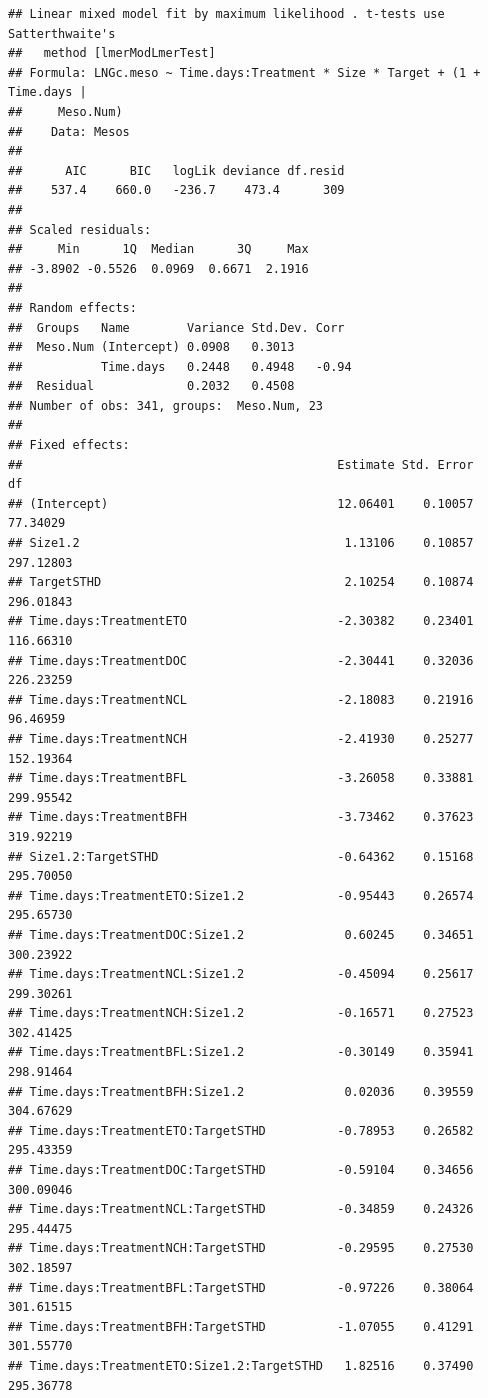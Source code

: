 \documentclass[
]{article}
\begin{document}
\begin{verbatim}
## Linear mixed model fit by maximum likelihood . t-tests use Satterthwaite's
##   method [lmerModLmerTest]
## Formula: LNGc.meso ~ Time.days:Treatment * Size * Target + (1 + Time.days |  
##     Meso.Num)
##    Data: Mesos
## 
##      AIC      BIC   logLik deviance df.resid 
##    537.4    660.0   -236.7    473.4      309 
## 
## Scaled residuals: 
##     Min      1Q  Median      3Q     Max 
## -3.8902 -0.5526  0.0969  0.6671  2.1916 
## 
## Random effects:
##  Groups   Name        Variance Std.Dev. Corr 
##  Meso.Num (Intercept) 0.0908   0.3013        
##           Time.days   0.2448   0.4948   -0.94
##  Residual             0.2032   0.4508        
## Number of obs: 341, groups:  Meso.Num, 23
## 
## Fixed effects:
##                                            Estimate Std. Error        df
## (Intercept)                                12.06401    0.10057  77.34029
## Size1.2                                     1.13106    0.10857 297.12803
## TargetSTHD                                  2.10254    0.10874 296.01843
## Time.days:TreatmentETO                     -2.30382    0.23401 116.66310
## Time.days:TreatmentDOC                     -2.30441    0.32036 226.23259
## Time.days:TreatmentNCL                     -2.18083    0.21916  96.46959
## Time.days:TreatmentNCH                     -2.41930    0.25277 152.19364
## Time.days:TreatmentBFL                     -3.26058    0.33881 299.95542
## Time.days:TreatmentBFH                     -3.73462    0.37623 319.92219
## Size1.2:TargetSTHD                         -0.64362    0.15168 295.70050
## Time.days:TreatmentETO:Size1.2             -0.95443    0.26574 295.65730
## Time.days:TreatmentDOC:Size1.2              0.60245    0.34651 300.23922
## Time.days:TreatmentNCL:Size1.2             -0.45094    0.25617 299.30261
## Time.days:TreatmentNCH:Size1.2             -0.16571    0.27523 302.41425
## Time.days:TreatmentBFL:Size1.2             -0.30149    0.35941 298.91464
## Time.days:TreatmentBFH:Size1.2              0.02036    0.39559 304.67629
## Time.days:TreatmentETO:TargetSTHD          -0.78953    0.26582 295.43359
## Time.days:TreatmentDOC:TargetSTHD          -0.59104    0.34656 300.09046
## Time.days:TreatmentNCL:TargetSTHD          -0.34859    0.24326 295.44475
## Time.days:TreatmentNCH:TargetSTHD          -0.29595    0.27530 302.18597
## Time.days:TreatmentBFL:TargetSTHD          -0.97226    0.38064 301.61515
## Time.days:TreatmentBFH:TargetSTHD          -1.07055    0.41291 301.55770
## Time.days:TreatmentETO:Size1.2:TargetSTHD   1.82516    0.37490 295.36778

\end{verbatim}
\end{document}
